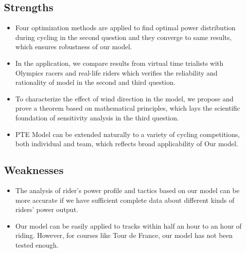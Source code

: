 \subsection{Strengths}

\begin{itemize}
	\item {\bf } Four optimization methods are applied to find optimal power distribution during cycling in the second question and they converge to same results, which ensures robustness of our model.

	\item {\bf } In the application, we compare results from virtual time trialists with Olympics racers and real-life riders which verifies the reliability and rationality of model in the second and third question.

	\item {\bf } To characterize the effect of wind direction in the model, we propose and prove a theorem based on mathematical principles, which lays the scientific foundation of sensitivity analysis in the third question.

	\item {\bf } PTE Model can be extended naturally to a variety of cycling competitions, both individual and team, which reflects broad applicability of Our model.
\end{itemize}

\subsection{Weaknesses}

\begin{itemize}
	\item {\bf } The analysis of rider's power profile and tactics based on our model can be more accurate if we have sufficient complete data about different kinds of riders' power output.
\end{itemize}

\begin{itemize}
	\item {\bf } Our model can be easily applied to tracks within half an hour to an hour of riding. However, for courses like Tour de France, our model has not been tested enough.
\end{itemize}